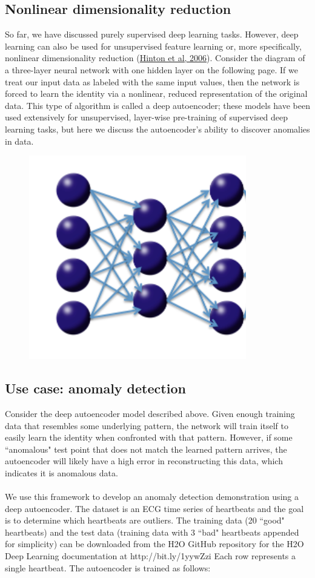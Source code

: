 \documentclass{article}[11pt]
\begin{document}
\subsection{Nonlinear dimensionality reduction} 
So far, we have discussed purely supervised deep learning tasks. However, deep learning can also be used for unsupervised feature learning or, more specifically, nonlinear dimensionality reduction  (\href{http://www.cs.toronto.edu/~hinton/science.pdf}{Hinton et al, 2006}). Consider the diagram of a three-layer neural network with one hidden layer on the following page. If we treat our input data as labeled with the same input values, then the network is forced to learn the identity via a nonlinear, reduced representation of the original data. This type of algorithm is called a deep autoencoder; these models have been used extensively for unsupervised, layer-wise pre-training of supervised deep learning tasks, but here we discuss the autoencoder's ability to discover anomalies in data. 
\\
\begin{figure}[h!]
\centering
\includegraphics[scale=0.7]{autoencoder.png}
\end{figure}
\subsection{Use case: anomaly detection} 
Consider the deep autoencoder model described above. Given enough training data that resembles some underlying pattern, the network will train itself to easily learn the identity when confronted with that pattern. However, if some ``anomalous" test point that does not match the learned pattern arrives, the autoencoder will likely have a high error in reconstructing this data, which indicates it is anomalous data.
\\
\\
We use this framework to develop an anomaly detection demonstration using a deep autoencoder. The dataset is an ECG time series of heartbeats and the goal is to determine which heartbeats are outliers. The training data (20 ``good" heartbeats) and the test data (training data with 3 ``bad" heartbeats appended for simplicity) can be downloaded from the H2O GitHub repository for the H2O Deep Learning documentation at http://bit.ly/1yywZzi%
Each row represents a single heartbeat. The autoencoder is trained as follows: 
\end{document}
